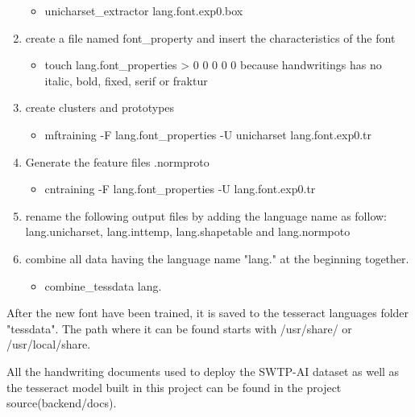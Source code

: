 \begin{enumerate}
\begin{itemize}
		\item unicharset\_extractor lang.font.exp0.box
	  \end{itemize}
	\item create a file named font\_property and insert the characteristics of the font
	\begin{itemize}
		\item touch lang.font\_properties > 0 0 0 0 0 because handwritings has no italic, bold, fixed, serif or fraktur
	  \end{itemize}
	\item create clusters and prototypes
	\begin{itemize}
		\item mftraining -F lang.font\_properties -U unicharset lang.font.exp0.tr
	  \end{itemize}
	\item Generate the feature files .normproto 
	\begin{itemize}
		\item cntraining -F lang.font\_properties -U lang.font.exp0.tr
	  \end{itemize}
    \item rename the following output files by adding the language name as follow: lang.unicharset, lang.inttemp, lang.shapetable and lang.normpoto
    \item combine all data having the language name "lang." at the beginning together.
	\begin{itemize}
		\item combine\_tessdata lang.
	  \end{itemize}
 \end{enumerate}

After the new font have been trained, it is saved to the tesseract languages folder "tessdata".
The path where it can be found starts with /usr/share/ or /usr/local/share.

All the handwriting documents used to deploy the SWTP-AI dataset as well as the tesseract model built in this project
can be found in the project source(backend/docs).
